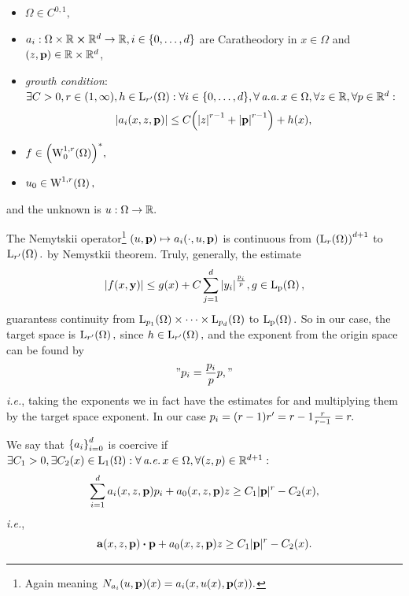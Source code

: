 \documentclass{article}
\begin{document}
\begin{itemize}
	\item $\Omega \in C^{0,1},$
	\item $a_i: \Omega \times {\mathbb R} \cross {\mathbb R}^d \to {\mathbb R}, i \in \qty{0,\dots,d}$ are Caratheodory in $x \in \Omega$ and $\qty(z, \vb{p}) \in {\mathbb R} \times {\mathbb R}^d$,
		\item \textit{growth condition}: $\exists C>0, r \in (1,\infty), h \in \LpSet[r']{\Omega}: \forall i \in \qty{0, \dots, d}, \forall  \, \text{\textit{a.a.}} \, x\in \Omega, \forall z \in \R, \forall p \in \R^d:$
			\[
				\abs{a_i\qty(x,z,\vb{p})} \leq C\qty(\abs{z}^{r-1}+\abs{\vb{p}}^{r-1})+h(x),
			\]
		\item $f \in \qty(\WkpzeroSet[1][r]{\Omega})^{*},$
		\item $u_0 \in \WkpSet[1][r]{\Omega},$
\end{itemize}
and the unknown is $u: \Omega \to {\mathbb R}.$
\begin{remark}
	The Nemytskii operator\footnote{Again meaning $N_{a_i}(u,\vb{p})(x) = a_i\qty(x, u(x), \vb{p}(x)).$} $(u,\vb{p}) \mapsto a_i\qty(\cdot, u, \vb{p})$ is continuous from $\qty(\LpSet[r]{\Omega})^{d+1}$ to $\LpSet[r']{\Omega}.$ by Nemystkii theorem. Truly, generally, the estimate
	\[
		\abs{f(x,\vb{y})} \leq g(x) + C \sum_{j=1}^d \abs{y_i}^{\frac{p_i}{p}}, g \in \LpSet{\Omega},
	\]
	guarantess continuity from $\LpSet[p_1]{\Omega} \times \dots \times \LpSet[p_d]{\Omega}$ to $\LpSet{\Omega}.$ So in our case, the target space is $\LpSet[r']{\Omega},$ since $h \in \LpSet[r']{\Omega},$ and the exponent from the origin space can be found by
	\[
		"p_i = \frac{p_i}{p} p,"
	\]
	\textit{i.e.}, taking the exponents we in fact have the estimates for and multiplying them by the target space exponent. In our case $p_i = \qty(r-1)r' = r-1 \frac{r}{r-1} = r.$ 
\end{remark}


\begin{definition}[Coercivity]
	We say that $\qty{a_i}_{i=0}^d$ is coercive if $\exists C_1 > 0, \exists C_2(x) \in \LpSet[1]{\Omega}: \forall \, \text{\textit{a.e.}} \, x \in \Omega, \forall (z,p) \in \R^{d+1}:$
	\[
		\sum_{i=1}^d a_i\qty(x,z,\vb{p})p_i + a_0\qty(x,z,\vb{p})z \geq C_1 |\vb{p}|^r-C_2(x), 
	\]
	\textit{i.e.},
	\[
		\vb{a}\qty(x,z,\vb{p}) \vdot \vb{p} + a_0\qty(x,z,\vb{p})z \geq C_1 |\vb{p}|^r - C_2(x).
	\]

\end{definition}
\end{document}
